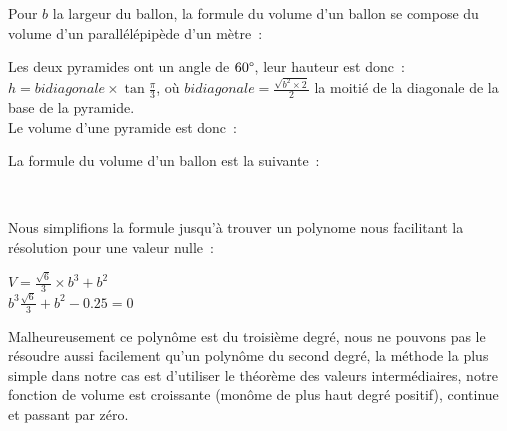 \documentclass[a4paper,11pt]{article}
\begin{document}
\bigbreak

Pour $b$ la largeur du ballon, la formule du volume d'un ballon se compose du volume d'un parallélépipède d'un mètre~:

\begin{center}
\end{center}

Les deux pyramides ont un angle de $60 \degree$, leur hauteur est donc~: $\displaystyle{h = bidiagonale \times \tan{\frac{\pi}{3}}}$, où $\displaystyle{bidiagonale = \frac{\sqrt{b^2 \times 2}}{2}}$ la moitié de la diagonale de la base de la pyramide. \\
Le volume d'une pyramide est donc~:

\begin{center}
\end{center}

La formule du volume d'un ballon est la suivante~:

\begin{center}
	 \\
\end{center}

Nous simplifions la formule jusqu'à trouver un polynome nous facilitant la résolution pour une valeur nulle~:

\begin{center}
  $\displaystyle{V = \frac{\sqrt{6}}{3} \times b^3 + b^2 }$ \\
  $\displaystyle{b^3 \frac{\sqrt{6}}{3} + b^2 - 0.25 = 0}$
\end{center}

Malheureusement ce polynôme est du troisième degré, nous ne pouvons pas le résoudre aussi facilement qu'un polynôme du second degré, la méthode la plus simple dans notre cas est d'utiliser le théorème des valeurs intermédiaires, notre fonction de volume est croissante (monôme de plus haut degré positif), continue et passant par zéro.

\end{document}

